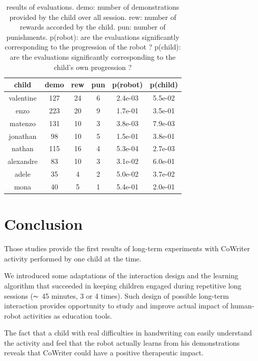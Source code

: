 \documentclass{sig-alternate}
\begin{document}
\begin{table}
    \centering
    \begin{tabular}{|c|c|c|c|c|c|}
        \hline
        child & demo & rew & pun & p(robot) & p(child)\\ \hline
        valentine & 127 & 24 & 6 & 2.4e-03 & 5.5e-02\\ \hline
        enzo & 223 & 20 & 9 & 1.7e-01 & 3.5e-01\\ \hline
        matenzo & 131 & 10 & 3 & 3.8e-03 & 7.9e-03\\ \hline
        jonathan & 98 & 10 & 5 &  1.5e-01 & 3.8e-01\\ \hline
        nathan & 115 & 16 & 4 & 5.3e-04 & 2.7e-03\\ \hline
        alexandre & 83 & 10 & 3 & 3.1e-02 & 6.0e-01\\ \hline
        adele & 35 & 4 & 2 & 5.0e-02 & 3.7e-02\\ \hline
        mona & 40 & 5 & 1 &  5.4e-01 & 2.0e-01\\ \hline
    \end{tabular}
    \caption{\small results of evaluations. demo: number of demonstrations provided by
        the child over all session. rew: number of rewards accorded by
        the child. pun: number of punishments. p(robot): are the evaluations
        significantly corresponding to the progression of the robot ? p(child): are the
        evaluations significantly corresponding to the child's own
progression ?}
    \label{table:scores}
\end{table}


\section{Conclusion}
Those studies provide the first results of long-term experiments 
with CoWriter activity performed by one child at the time. 

We introduced some adaptations of
the interaction design and the learning algorithm that succeeded in keeping
children engaged during repetitive long sessions ($\thicksim$ 45 minutes, 3 or 4 times).
Such design of possible long-term interaction provides
opportunity to study and improve actual impact of human-robot activities as
education tools.

The fact that a child with real difficulties in handwriting can easily
understand the activity and feel that the robot actually learns from his
demonstrations reveals that CoWriter could have a positive therapeutic impact.
\end{document}
